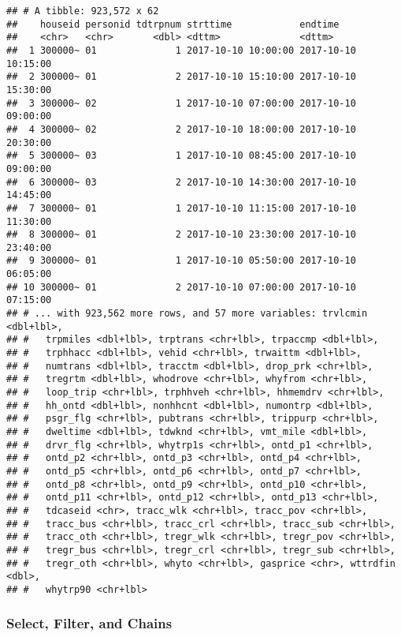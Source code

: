 \documentclass[]{book}
\begin{document}
\begin{verbatim}
## # A tibble: 923,572 x 62
##    houseid personid tdtrpnum strttime            endtime            
##    <chr>   <chr>       <dbl> <dttm>              <dttm>             
##  1 300000~ 01              1 2017-10-10 10:00:00 2017-10-10 10:15:00
##  2 300000~ 01              2 2017-10-10 15:10:00 2017-10-10 15:30:00
##  3 300000~ 02              1 2017-10-10 07:00:00 2017-10-10 09:00:00
##  4 300000~ 02              2 2017-10-10 18:00:00 2017-10-10 20:30:00
##  5 300000~ 03              1 2017-10-10 08:45:00 2017-10-10 09:00:00
##  6 300000~ 03              2 2017-10-10 14:30:00 2017-10-10 14:45:00
##  7 300000~ 01              1 2017-10-10 11:15:00 2017-10-10 11:30:00
##  8 300000~ 01              2 2017-10-10 23:30:00 2017-10-10 23:40:00
##  9 300000~ 01              1 2017-10-10 05:50:00 2017-10-10 06:05:00
## 10 300000~ 01              2 2017-10-10 07:00:00 2017-10-10 07:15:00
## # ... with 923,562 more rows, and 57 more variables: trvlcmin <dbl+lbl>,
## #   trpmiles <dbl+lbl>, trptrans <chr+lbl>, trpaccmp <dbl+lbl>,
## #   trphhacc <dbl+lbl>, vehid <chr+lbl>, trwaittm <dbl+lbl>,
## #   numtrans <dbl+lbl>, tracctm <dbl+lbl>, drop_prk <chr+lbl>,
## #   tregrtm <dbl+lbl>, whodrove <chr+lbl>, whyfrom <chr+lbl>,
## #   loop_trip <chr+lbl>, trphhveh <chr+lbl>, hhmemdrv <chr+lbl>,
## #   hh_ontd <dbl+lbl>, nonhhcnt <dbl+lbl>, numontrp <dbl+lbl>,
## #   psgr_flg <chr+lbl>, pubtrans <chr+lbl>, trippurp <chr+lbl>,
## #   dweltime <dbl+lbl>, tdwknd <chr+lbl>, vmt_mile <dbl+lbl>,
## #   drvr_flg <chr+lbl>, whytrp1s <chr+lbl>, ontd_p1 <chr+lbl>,
## #   ontd_p2 <chr+lbl>, ontd_p3 <chr+lbl>, ontd_p4 <chr+lbl>,
## #   ontd_p5 <chr+lbl>, ontd_p6 <chr+lbl>, ontd_p7 <chr+lbl>,
## #   ontd_p8 <chr+lbl>, ontd_p9 <chr+lbl>, ontd_p10 <chr+lbl>,
## #   ontd_p11 <chr+lbl>, ontd_p12 <chr+lbl>, ontd_p13 <chr+lbl>,
## #   tdcaseid <chr>, tracc_wlk <chr+lbl>, tracc_pov <chr+lbl>,
## #   tracc_bus <chr+lbl>, tracc_crl <chr+lbl>, tracc_sub <chr+lbl>,
## #   tracc_oth <chr+lbl>, tregr_wlk <chr+lbl>, tregr_pov <chr+lbl>,
## #   tregr_bus <chr+lbl>, tregr_crl <chr+lbl>, tregr_sub <chr+lbl>,
## #   tregr_oth <chr+lbl>, whyto <chr+lbl>, gasprice <chr>, wttrdfin <dbl>,
## #   whytrp90 <chr+lbl>
\end{verbatim}

\hypertarget{select-filter-and-chains}{%
\subsubsection{Select, Filter, and Chains}\label{select-filter-and-chains}}
\end{document}
